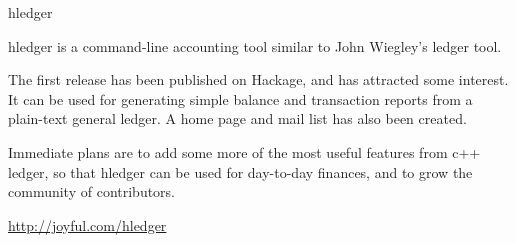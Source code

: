 \begin{hcarentry}{hledger}
\participants{}
\makeheader

hledger is a command-line accounting tool similar to John Wiegley’s ledger tool.

The first release has been published on Hackage, and has attracted some
interest. It can be used for generating simple balance and transaction
reports from a plain-text general ledger. A home page and mail list has
also been created.

Immediate plans are to add some more of the most useful features from c++
ledger, so that hledger can be used for day-to-day finances, and to grow
the community of contributors.

\FurtherReading
  \url{http://joyful.com/hledger}
\end{hcarentry}
